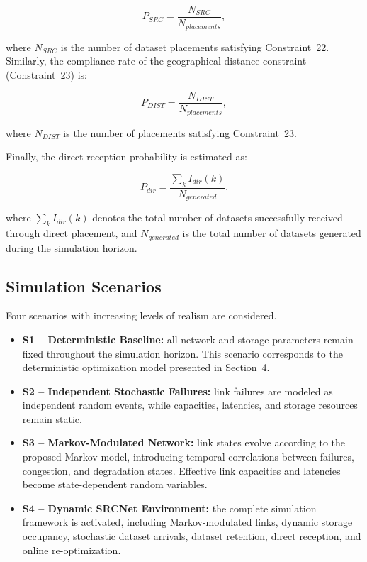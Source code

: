 \documentclass[a4paper,fleqn]{cas-dc}
\begin{document}
\begin{equation} 
P_{SRC} = \frac{N_{SRC}} {N_{placements}}, 
\end{equation} 

where \(N_{SRC}\) is the number of dataset placements satisfying Constraint~22. Similarly, the compliance rate of the geographical distance constraint (Constraint~23) is:

\begin{equation} 
P_{DIST} = \frac{N_{DIST}} {N_{placements}}, 
\end{equation} 

where \(N_{DIST}\) is the number of placements satisfying Constraint~23. 

Finally, the direct reception probability is estimated as:

\begin{equation} 
P_{dir} = \frac{\sum_k I_{dir}(k)} {N_{generated}}. 
\end{equation}

where \(\sum_k I_{dir}(k)\) denotes the total number of datasets successfully received through direct placement, and \(N_{generated}\) is the total number of datasets generated during the simulation horizon.


\subsection*{Simulation Scenarios}

Four scenarios with increasing levels of realism are considered. 

\begin{itemize} 
\item \textbf{S1 -- Deterministic Baseline:} all network and storage parameters remain fixed throughout the simulation horizon. This scenario corresponds to the deterministic optimization model presented in Section~4. 
\item \textbf{S2 -- Independent Stochastic Failures:} link failures are modeled as independent random events, while capacities, latencies, and storage resources remain static.
\item \textbf{S3 -- Markov-Modulated Network:} link states evolve according to the proposed Markov model, introducing temporal correlations between failures, congestion, and degradation states. Effective link capacities and latencies become state-dependent random variables.
\item \textbf{S4 -- Dynamic SRCNet Environment:} the complete simulation framework is activated, including Markov-modulated links, dynamic storage occupancy, stochastic dataset arrivals, dataset retention, direct reception, and online re-optimization. 
\end{itemize} 
\end{document}
